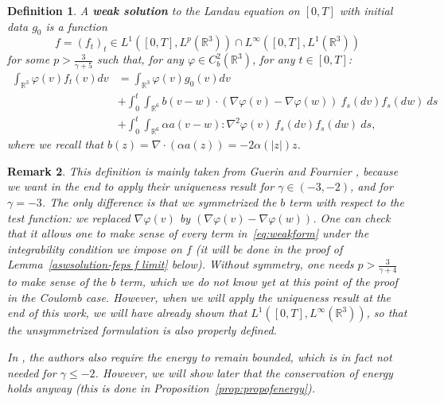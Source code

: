 \documentclass[11pt,a4paper]{article}
\theoremstyle{definition}
\theoremstyle{plain}
\newtheorem{defi}{Definition}[section]
\newtheorem{remark}[defi]{Remark}
\begin{document}
\begin{defi}
\label{def:weaksolution}
    A \textbf{weak solution} to the Landau equation on $[0,T]$ with initial data $g_0$ is a function $$f=(f_t)_t\in L^1([0,T], L^p(\mathbb{R}^3)) \cap L^\infty([0,T], L^1(\mathbb{R}^3))$$
    for some $p>\frac{3}{\gamma + 5}$ such that, for any $\varphi\in C^2_b(\mathbb{R}^3)$, for any $t\in[0,T]$:
    \begin{align}
    \label{eq:weakform}
     \int_{\mathbb{R}^3} \varphi(v)f_t(v)dv &= \int_{\mathbb{R}^3} \varphi(v)g_0(v)dv\nonumber\\
    &+ \int_0^t \int_{\mathbb{R}^6} b(v-w) \cdot (\nabla\varphi(v)-\nabla\varphi(w))\ f_s(dv)f_s(dw)\ ds\\
    &+ \int_0^t \int_{\mathbb{R}^6} \alpha a(v-w):\nabla^2\varphi(v)\ f_s(dv)f_s(dw)\ ds,\nonumber
    \end{align}
where we recall that $b(z)=\nabla \cdot (\alpha a(z))=-2\alpha(\vert z\vert) z$.
\end{defi}
\begin{remark}
\label{rem:defwsol}
    This definition is mainly taken from Guerin and Fournier \cite[Definition 1.2]{GuerinFournier2008}, because we want in the end to apply their uniqueness result \cite{GuerinFournier2008} for $\gamma\in(-3,-2)$, and \cite{Fournier2010} for $\gamma=-3$. The only difference is that we symmetrized the $b$ term with respect to the test function: we replaced $\nabla\varphi(v)$ by $(\nabla\varphi(v)-\nabla\varphi(w))$. One can check that it allows one to make sense of every term in~\eqref{eq:weakform} under the integrability condition we impose on $f$ (it will be done in the proof of Lemma~\ref{aswsolution-feps f limit} below). Without symmetry, one needs $p>\frac{3}{\gamma + 4}$ to make sense of the $b$ term, which we do not know yet at this point of the proof in the Coulomb case. However, when we will apply the uniqueness result \cite{GuerinFournier2008,Fournier2010} at the end of this work, we will have already shown that $L^1([0,T], L^\infty(\mathbb{R}^3))$, so that the unsymmetrized formulation is also properly defined.
    
    In \cite[Definition 1.2]{GuerinFournier2008}, the authors also require the energy to remain bounded, which is in fact not needed for $\gamma\leq -2$. However, we will show later that the conservation of energy holds anyway (this is done in Proposition~\ref{prop:propofenergy}).
\end{remark}
\end{document}
